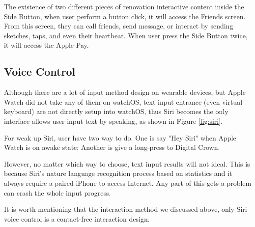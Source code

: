 The existence of two different pieces of renovation interactive content inside the Side Button, when user perform a button click, it will access the Friends screen. From this screen, they can call friends, send message, or interact by sending sketches, taps, and even their heartbeat. When user press the Side Button twice, it will access the Apple Pay.

\subsection{Voice Control}

Although there are a lot of input method design on wearable devices,
but Apple Watch did not take any of them on watchOS, text input entrance
(even virtual keyboard) are not directly setup into watchOS, thus Siri becomes
the only interface allows user input text by speaking, as shown in Figure \ref{fig:siri}.

For weak up Siri, user have two way to do. One is say "Hey Siri" when Apple Watch is
on awake state; Another is give a long-press to Digital Crown.

However, no matter which way to choose, text input results will not ideal.
This is because Siri's nature language recognition process based on statistics and
it always require a paired iPhone to access Internet.
Any part of this gets a problem can crash the whole input progress.

It is worth mentioning that the interaction method we discussed above,
only Siri voice control is a contact-free  interaction design.

\cleardoublepage

